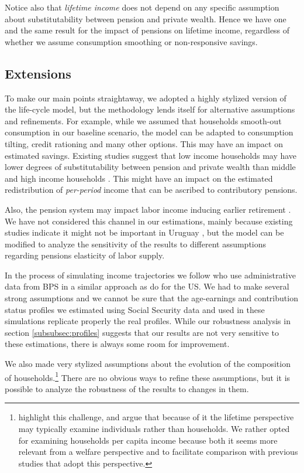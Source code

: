\documentclass{article}
\begin{document}
Notice also that \textit{lifetime income} does not depend on any specific assumption about substitutability between pension and private wealth. Hence we have one and the same result for the impact of pensions on lifetime income, regardless of whether we assume consumption smoothing or non-responsive savings.   

\subsection{Extensions}  

To make our main points straightaway, we adopted a highly stylized version of the life-cycle model, but the methodology lends itself for alternative assumptions and refinements. For example, while we assumed that households smooth-out consumption in our baseline scenario, the model can be adapted to consumption tilting, credit rationing and many other options. This may have an impact on estimated savings. Existing studies suggest that low income households may have lower degrees of substitutability between pension and private wealth than middle and high income households \parencite{Attanasio2003b, Attanasio2003a}. This might have an impact on the estimated redistribution of \textit{per-period} income that can be ascribed to contributory pensions. 

     

Also, the pension system may impact labor income inducing earlier retirement \parencite{Gruber1999a, Gruber2004, Jimenez2007}. We have not considered this channel in our estimations, mainly because existing studies indicate it might not be important in Uruguay \parencite{Alvarez2012, Forteza2015b}, but the model can be modified to analyze the sensitivity of the results to different assumptions regarding pensions elasticity of labor supply.

In the process of simulating income trajectories we follow \textcite{pena2005estimacion} who use administrative data from BPS in a similar approach as \textcite{bosworth2000lifetime} do for the US. We had to make several strong assumptions and we cannot be sure that the age-earnings and contribution status profiles we estimated using Social Security data and used in these simulations replicate properly the real profiles. While our robustness analysis in section \ref{subsubsec:profiles} suggests that our results are not very sensitive to these estimations, there is always some room for improvement.

We also made very stylized assumptions about the evolution of the composition of households.\footnote{\textcite{Fullerton1991} highlight this challenge, and argue that because of it the lifetime perspective may typically examine individuals rather than households. We rather opted for examining households per capita income because both it seems more relevant from a welfare perspective and to facilitate comparison with previous studies that adopt this perspective.} There are no obvious ways to refine these assumptions, but it is possible to analyze the robustness of the results to changes in them.  
\end{document}
